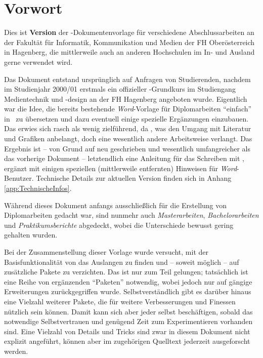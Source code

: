 \chapter{Vorwort} 	%


Dies ist \textbf{Version \hgbDate} der \latex-Dokumentenvorlage für 
verschiedene Abschlussarbeiten an der Fakultät für Informatik, Kommunikation
und Medien der FH Oberösterreich in Hagenberg, die mittlerweile auch 
an anderen Hochschulen im In- und Ausland gerne verwendet wird.

Das Dokument entstand ursprünglich auf Anfragen von Studierenden,
nachdem im Studienjahr 2000/01 erstmals ein offizieller
\latex-Grundkurs im Studiengang Medientechnik und -design an der
FH Hagenberg angeboten wurde. Eigentlich war die Idee, die bereits
bestehende \emph{Word}-Vorlage für Diplomarbeiten "`einfach"' in
\latex\ zu übersetzen und dazu eventuell einige spezielle
Ergänzungen einzubauen. Das erwies sich rasch als wenig
zielführend, da \latex, \va was den Umgang mit Literatur und
Grafiken anbelangt, doch eine wesentlich andere Arbeitsweise
verlangt. Das Ergebnis ist -- von Grund auf neu geschrieben und
wesentlich umfangreicher als das vorherige Dokument --
letztendlich eine Anleitung für das Schreiben mit \latex, ergänzt
mit einigen speziellen (mittlerweile entfernten) Hinweisen für \emph{Word}-Benutzer.
Technische Details zur aktuellen Version finden sich in Anhang \ref{app:TechnischeInfos}.

Während dieses Dokument anfangs ausschließlich für die Erstellung
von Diplomarbeiten gedacht war, sind nunmehr auch  
\emph{Masterarbeiten}, \emph{Bachelor\-arbeiten} und \emph{Praktikumsberichte} 
abgedeckt, wobei die Unterschiede bewusst gering gehalten wurden.

Bei der Zusammenstellung dieser Vorlage wurde versucht, mit der
Basisfunktionalität von \latex das Auslangen zu finden und -- soweit möglich --
auf zusätzliche Pakete zu verzichten. Das ist nur zum Teil gelungen;
tat\-säch\-lich ist eine Reihe von ergänzenden "`Paketen"' notwendig, wobei jedoch
nur auf gängige Erweiterungen zurückgegriffen wurde.
Selbstverständlich gibt es darüber hinaus eine Vielzahl weiterer Pakete,
die für weitere Verbesserungen und Finessen nützlich sein können. Damit kann
sich aber jeder selbst beschäftigen, sobald das notwendige Selbstvertrauen und
genügend Zeit zum Experimentieren vorhanden sind.
Eine Vielzahl von Details und Tricks sind zwar in diesem Dokument nicht explizit
angeführt, können aber im zugehörigen Quelltext jederzeit ausgeforscht
werden.

